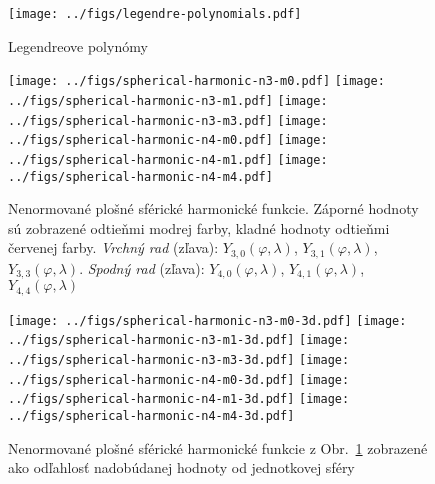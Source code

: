 \documentclass[a4paper, 12pt]{book}
\begin{document}



\begin{figure}[bt]
\centering
\texttt{[image: ../figs/legendre-polynomials.pdf]}
\caption{Legendreove polynómy}
\end{figure}




\begin{figure}[bt]
\centering
\texttt{[image: ../figs/spherical-harmonic-n3-m0.pdf]}
\texttt{[image: ../figs/spherical-harmonic-n3-m1.pdf]}
\texttt{[image: ../figs/spherical-harmonic-n3-m3.pdf]}
\texttt{[image: ../figs/spherical-harmonic-n4-m0.pdf]}
\texttt{[image: ../figs/spherical-harmonic-n4-m1.pdf]}
\texttt{[image: ../figs/spherical-harmonic-n4-m4.pdf]}
\caption{Nenormované plošné sférické harmonické funkcie.  Záporné hodnoty sú 
zobrazené odtieňmi modrej farby, kladné hodnoty odtieňmi červenej farby.  
\textit{Vrchný rad} (zľava): $Y_{3,0}(\varphi, \lambda)$, $Y_{3,1}(\varphi, 
\lambda)$, $Y_{3,3}(\varphi, \lambda)$.  \textit{Spodný rad} (zľava): 
$Y_{4,0}(\varphi, \lambda)$, $Y_{4,1}(\varphi, \lambda)$, $Y_{4,4}(\varphi, 
\lambda)$}
\label{fig:sh}
\end{figure}


\begin{figure}[bt]
\centering
\texttt{[image: ../figs/spherical-harmonic-n3-m0-3d.pdf]}
\texttt{[image: ../figs/spherical-harmonic-n3-m1-3d.pdf]}
\texttt{[image: ../figs/spherical-harmonic-n3-m3-3d.pdf]}
\texttt{[image: ../figs/spherical-harmonic-n4-m0-3d.pdf]}
\texttt{[image: ../figs/spherical-harmonic-n4-m1-3d.pdf]}
\texttt{[image: ../figs/spherical-harmonic-n4-m4-3d.pdf]}
\caption{Nenormované plošné sférické harmonické funkcie z Obr.~\ref{fig:sh} 
zobrazené ako odľahlosť nadobúdanej hodnoty od jednotkovej sféry}
\label{fig:sh3d}
\end{figure}





\end{document}
